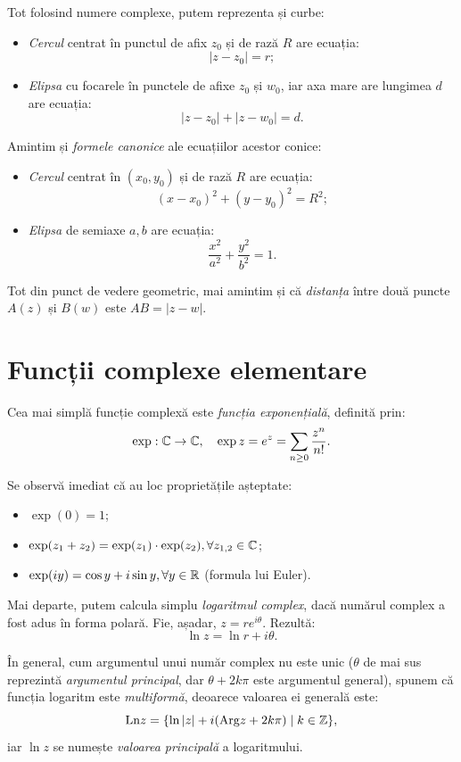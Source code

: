 Tot folosind numere complexe, putem reprezenta și curbe:
\begin{itemize}
\item \emph{Cercul} centrat în punctul de afix $ z_0 $ și de rază $ R $ are ecuația:
  \[
    |z - z_0| = r;
  \]
\item \emph{Elipsa} cu focarele în punctele de afixe $ z_0 $ și $ w_0 $,
  iar axa mare are lungimea $ d $ are ecuația:
  \[
    |z - z_0| + |z - w_0| = d.
  \]
\end{itemize}

Amintim și \emph{formele canonice} ale ecuațiilor acestor conice:
\begin{itemize}
\item \emph{Cercul} centrat în $ (x_0, y_0) $ și de rază $ R $ are
  ecuația:
  \[
    (x - x_0)^2 + (y - y_0)^2 = R^2;
  \]
\item \emph{Elipsa} de semiaxe $ a, b $ are ecuația:
  \[
    \dfrac{x^2}{a^2} + \dfrac{y^2}{b^2} = 1.
  \]
\end{itemize}

Tot din punct de vedere geometric, mai amintim și că \emph{distanța} între
două puncte $ A(z) $ și $ B(w) $ este $ AB = |z - w| $.

\section{Funcții complexe elementare}

Cea mai simplă funcție complexă este \emph{funcția exponențială}, definită prin:
\[
  \exp : \mathbb{C} \to \mathbb{C}, \quad \exp z = e^z = \sum_{n \geq 0} \dfrac{z^n}{n!}.
\]

Se observă imediat că au loc proprietățile așteptate:
\begin{itemize}
\item $ \exp(0) = 1 $;
\item $ \exp(z_1 + z_2) = \exp(z_1) \cdot \exp(z_2), \forall z_{1,2} \in \mathbb{C} $;
\item $ \exp(iy) = \cos y + i \sin y, \forall y \in \mathbb{R} $ (formula lui Euler).
\end{itemize}

Mai departe, putem calcula simplu \emph{logaritmul complex}, dacă numărul complex
a fost adus în forma polară. Fie, așadar, $ z = re^{i\theta} $. Rezultă:
\[
  \ln z = \ln r + i\theta.
\]

În general, cum argumentul unui număr complex nu este unic ($ \theta $ de mai sus
reprezintă \emph{argumentul principal}, dar $ \theta + 2 k\pi $ este argumentul
general), spunem că funcția logaritm este \emph{multiformă}, deoarece valoarea ei
generală este:
\[
  \mathrm{Ln}z = \{ \ln |z| + i(\mathrm{Arg}z + 2 k \pi) \mid k \in \mathbb{Z} \},
\]
iar $ \ln z $ se numește \emph{valoarea principală} a logaritmului.

